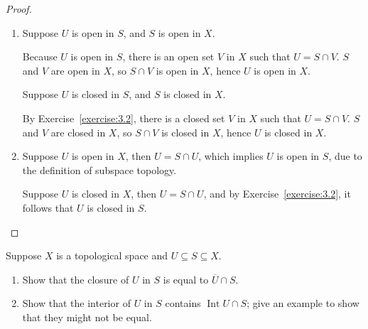 \begin{proof}
    \begin{enumerate}[label={(\alph*)}]
        \item Suppose $U$ is open in $S$, and $S$ is open in $X$.

              Because $U$ is open in $S$, there is an open set $V$ in $X$ such that $U = S\cap V$. $S$ and $V$ are open in $X$, so $S\cap V$ is open in $X$, hence $U$ is open in $X$.

              Suppose $U$ is closed in $S$, and $S$ is closed in $X$.

              By Exercise~\ref{exercise:3.2}, there is a closed set $V$ in $X$ such that $U = S\cap V$. $S$ and $V$ are closed in $X$, so $S\cap V$ is closed in $X$, hence $U$ is closed in $X$.
        \item Suppose $U$ is open in $X$, then $U = S\cap U$, which implies $U$ is open in $S$, due to the definition of subspace topology.

              Suppose $U$ is closed in $X$, then $U = S\cap U$, and by Exercise~\ref{exercise:3.2}, it follows that $U$ is closed in $S$.
    \end{enumerate}
\end{proof}

\begin{exercise}{3.7}\label{exercise:3.7}
    Suppose $X$ is a topological space and $U\subseteq S\subseteq X$.
    \begin{enumerate}[label={(\alph*)}]
        \item Show that the closure of $U$ in $S$ is equal to $\overline{U}\cap S$.
        \item Show that the interior of $U$ in $S$ contains $\operatorname{Int}U\cap S$; give an example to show that they might not be equal.
    \end{enumerate}
\end{exercise}

